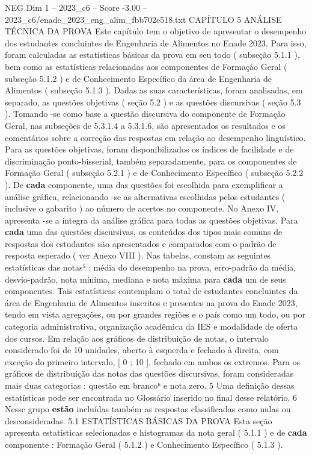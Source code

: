 \begin{textsample}{NEG Dim 1 – 2023\_c6 – Score -3.00 – 2023\_c6/enade\_2023\_eng\_alim\_fbb702e518.txt}  \label{ex:f1_neg_209}
CAPÍTULO 5 ANÁLISE TÉCNICA DA PROVA Este capítulo tem o objetivo de apresentar o desempenho dos estudantes concluintes de Engenharia de Alimentos no Enade 2023.
Para isso, foram calculadas as estatísticas básicas da prova em seu todo ( subseção 5.1.1 ), bem como as estatísticas relacionadas aos componentes de Formação Geral ( subseção 5.1.2 ) e de Conhecimento Específico da área de Engenharia de Alimentos ( subseção 5.1.3 ).
Dadas as suas características, foram analisadas, em separado, as questões objetivas ( seção 5.2 ) e as questões discursivas ( seção 5.3 ).
Tomando -se como base a questão discursiva do componente de Formação Geral, nas subseções de 5.3.1.4 a 5.3.1.6, são apresentados os resultados e os comentários sobre a correção das respostas em relação ao desempenho linguístico.
Para as questões objetivas, foram disponibilizados os índices de facilidade e de discriminação ponto-bisserial, também separadamente, para os componentes de Formação Geral ( subseção 5.2.1 ) e de Conhecimento Específico ( subseção 5.2.2 ).
De \textbf{cada} componente, uma das questões foi escolhida para exemplificar a análise gráfica, relacionando -se as alternativas escolhidas pelos estudantes ( inclusive o gabarito ) ao número de acertos no componente.
No Anexo IV, apresenta -se a íntegra da análise gráfica para todas as questões objetivas.
Para \textbf{cada} uma das questões discursivas, os conteúdos dos tipos mais comuns de respostas dos estudantes são apresentados e comparados com o padrão de resposta esperado ( ver Anexo VIII ).
Nas tabelas, constam as seguintes estatísticas das notas⁵ : média do desempenho na prova, erro-padrão da média, desvio-padrão, nota mínima, mediana e nota máxima para \textbf{cada} um de seus componentes.
Tais estatísticas contemplam o total de estudantes concluintes da área de Engenharia de Alimentos inscritos e presentes na prova do Enade 2023, tendo em vista agregações, ou por grandes regiões e o país como um todo, ou por categoria administrativa, organização acadêmica da IES e modalidade de oferta dos cursos.
Em relação aos gráficos de distribuição de notas, o intervalo considerado foi de 10 unidades, aberto à esquerda e fechado à direita, com exceção do primeiro intervalo, [ 0 ; 10 ], fechado em ambos os extremos.
Para os gráficos de distribuição das notas das questões discursivas, foram consideradas mais duas categorias : questão em branco⁶ e nota zero. 5 Uma definição dessas estatísticas pode ser encontrada no Glossário inserido no final desse relatório. 6 Nesse grupo \textbf{estão} incluídas também as respostas classificadas como nulas ou desconsideradas. 5.1 ESTATÍSTICAS BÁSICAS DA PROVA Esta seção apresenta estatísticas selecionadas e histogramas da nota geral ( 5.1.1 ) e de \textbf{cada} componente : Formação Geral ( 5.1.2 ) e Conhecimento Específico ( 5.1.3 ).

\end{textsample}

